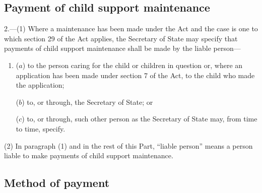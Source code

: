 \documentclass[12pt,a4paper]{article}
\begin{document}
\renewcommand\parthead{--- Part II}

\subsection[2. Payment of child support maintenance]{Payment of child support maintenance}

2.—(1) Where a maintenance 
has been made under the Act and the case is one to which section 29 of the Act applies, the Secretary of State may specify that payments of child support maintenance shall be made by the liable person—
\begin{enumerate}\item[]
($a$) to the person caring for the child or children in question or, where an application has been made under section 7 of the Act, to the child who made the application;

($b$) to, or through, the Secretary of State; or

($c$) to, or through, such other person as the Secretary of State may, from time to time, specify.
\end{enumerate}

(2) In paragraph (1) and in the rest of this Part, “liable person” means a person liable to make payments of child support maintenance.


\subsection[3. Method of payment]{Method of payment}
\end{document}
